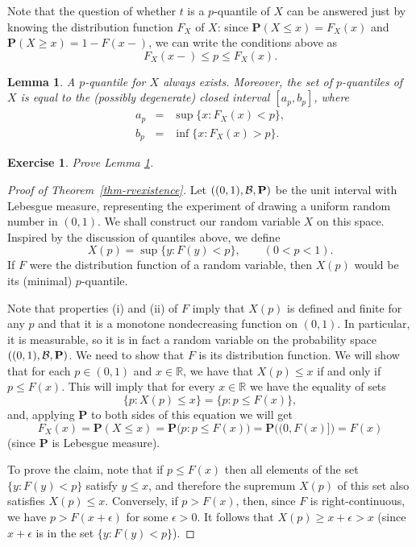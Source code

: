 \documentclass[12pt]{article}
\newtheorem{lemma}[thm]{Lemma}
\newtheorem{exercise}[thm]{Exercise}
\newcommand{\R}{\mathbb{R}}
\newcommand{\prob}{\mathbf{P}}
\theoremstyle{example}
\begin{document}
Note that the question of whether $t$ is a $p$-quantile of $X$ can be answered just by knowing the distribution function $F_X$ of $X$: since $\prob(X\le x)=F_X(x)$ and $\prob(X\ge x)=1-F(x-)$, we can write the conditions above as
$$ F_X(x-) \le p \le F_X(x). $$

\begin{lemma}
A $p$-quantile for $X$ always exists. Moreover, the set of $p$-quantiles of $X$ is equal to the (possibly degenerate) closed interval $[a_p, b_p]$, where
\begin{eqnarray*}
a_p &=& \sup \{ x : F_X(x) < p \}, \\
b_p &=& \inf \{ x : F_X(x) > p \}.
\end{eqnarray*}
\label{lem-quantile}
\end{lemma}

\begin{exercise} Prove Lemma \ref{lem-quantile}.
\end{exercise}

\begin{proof}[Proof of Theorem~\ref{thm-rvexistence}]
Let $((0,1), {\cal B}, \prob)$ be the unit interval with Lebesgue measure, representing the experiment of drawing a uniform random number in $(0,1)$. We shall construct our random variable $X$ on this space. Inspired by the discussion of quantiles above, we define
$$ X(p) = \sup\{ y : F(y) < p \}, \qquad (0<p<1). $$
If $F$ were the distribution function of a random variable, then $X(p)$ would be its (minimal) $p$-quantile. 

Note that properties (i) and (ii) of $F$ imply that $X(p)$ is defined and finite for any $p$ and that it is a monotone nondecreasing function on $(0,1)$. In particular, it is measurable, so it is in fact a random variable on the probability space $((0,1), {\cal B}, \prob)$. We need to show that $F$ is its distribution function. We will show that for each $p\in (0,1)$ and $x\in \R$, we have that $X(p) \le x$ if and only if $p \le F(x)$. This will imply that for every $x\in \R$ we have the equality of sets
$$ \{ p : X(p) \le x \} = \{ p : p \le F(x) \}, $$
and, applying $\prob$ to both sides of this equation we will get
$$ F_X(x) = \prob(X\le x) = \prob\big( p : p \le F(x) \big) = \prob\big( (0,F(x)] \big)
= F(x) $$
(since $\prob$ is Lebesgue measure).

To prove the claim, note that if $p \le F(x)$ then all elements of the set $\{ y : F(y) < p\}$
satisfy $y\le x$, and therefore the supremum $X(p)$ of this set also satisfies $X(p) \le x$. Conversely, if $p > F(x)$, then, since $F$ is right-continuous, we have $p > F(x+\epsilon)$ for some $\epsilon>0$. It follows that $X(p)\ge x+\epsilon>x$ (since $x+\epsilon$ is in the set $\{ y : F(y)<p \}$).
\end{proof}
\end{document}
